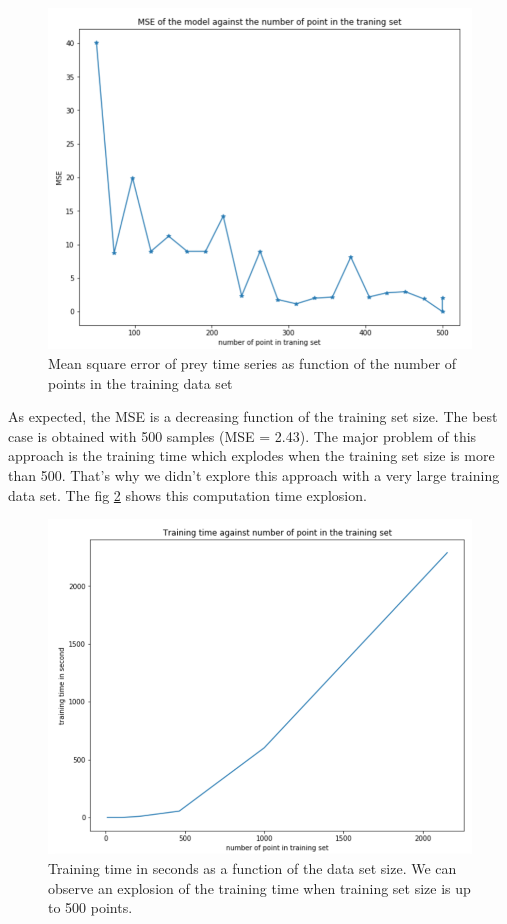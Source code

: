 \documentclass{article}
\begin{document}
\begin{figure}[H]
\centering
\includegraphics[scale=0.6]{image/mse_kriging.png}
\caption{Mean square error of prey time series as function of the number of points in the training data set}
\label{fig: kriging MSE}
\end{figure}
As expected, the MSE is a decreasing function of the training set size. The best case is obtained with 500 samples (MSE = 2.43). The major problem of this approach is the training time which explodes when the training set size is more than 500. That's why we didn't explore this approach with a very large training data set. The fig \ref{fig: training_time_explosion} shows this computation time explosion. 

\begin{figure}[H]
\centering
\includegraphics[scale=0.6]{image/kriging_time_explosion.png}
\caption{Training time in seconds as a function of the data set size. We can observe an explosion of the training time when training set size is up to 500 points.}
\label{fig: training_time_explosion}
\end{figure}
\end{document}
